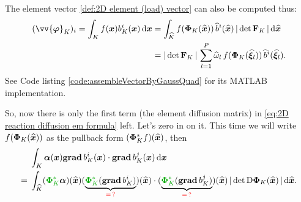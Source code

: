 	The element vector \eqref{def:2D element (load) vector} 
	can also be computed thus:
	\begin{align}
		(\vv{\bm{\varphi}}_K)_i = \int_{K} f(\bx) b_K^i(\bx)\,\dx
		&=\int_{\widehat{K}} f(\bm{\Phi}_K(\widehat{\bx}))\,
		\widehat{b}^i(\widehat{\bx})\,
		|\,\mathrm{det}\,\mathbf{F}_K\,|\,\rd\widehat{\bx} \nonumber \\
		&=|\,\mathrm{det}\,\mathbf{F}_K\,|\,
		\sum_{l=1}^{P}\widehat{\omega}_l\,
		f(\bm{\Phi}_K(\widehat{\bm{\xi}}_l))\,
		\widehat{b}^i(\widehat{\bm{\xi}}_l).%
		\label{eq:2D element vector quadrature formula}
	\end{align}	
	See Code listing \ref{code:assembleVectorByGaussQuad} for its MATLAB 
	implementation.%
	
	So, now there is only the first term (the element diffusion matrix) in 
	\eqref{eq:2D reaction diffusion em formula} left. Let's zero in on it.
	This time we will write $f(\bm{\Phi}_K(\widehat{\bm{x}}))$ as the pullback
	form $(\bm{\Phi}_K^* f)(\widehat{\bm{x}})$, then
	\begin{align}
		&\int_{K}\bm{\alpha}(\bx)\grad b_K^i(\bx)\cdot\grad b_K^j(\bx)\,\dx
		\nonumber \\
		=\;&\int_{\widehat{K}}
		(\textcolor{mid-green}{\bm{\Phi}_K^*}\bm{\alpha})(\widehat{\bx})
		(\underbrace{\textcolor{mid-green}{\bm{\Phi}_K^*}
			(\grad b_K^i)}_{\textcolor{red}{=\,?}})(\widehat{\bx})\cdot
		(\underbrace{\textcolor{mid-green}{\bm{\Phi}_K^*}
			(\grad b_K^j)}_{\textcolor{red}{=\,?}})(\widehat{\bx})\,
		|\,\mathrm{det}\,\mathrm{D}\bm{\Phi}_K(\widehat{\bx})\,|\,
		\rd\widehat{\bx}.\label{eq:vexing gradients}
	\end{align}
	
